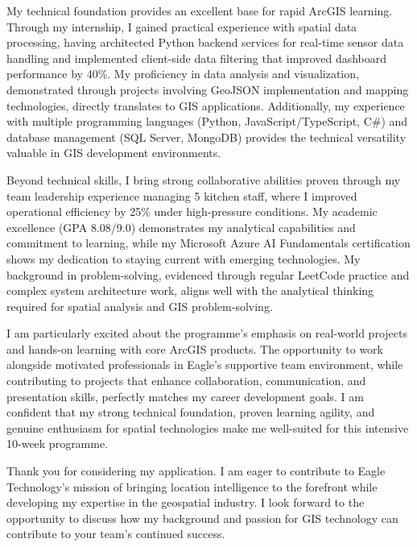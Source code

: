 \documentclass[11pt, a4paper]{awesome-cv}
\begin{document}
\begin{cvletter}
My technical foundation provides an excellent base for rapid ArcGIS learning. Through my internship, I gained practical experience with spatial data processing, having architected Python backend services for real-time sensor data handling and implemented client-side data filtering that improved dashboard performance by 40\%. My proficiency in data analysis and visualization, demonstrated through projects involving GeoJSON implementation and mapping technologies, directly translates to GIS applications. Additionally, my experience with multiple programming languages (Python, JavaScript/TypeScript, C\#) and database management (SQL Server, MongoDB) provides the technical versatility valuable in GIS development environments.

Beyond technical skills, I bring strong collaborative abilities proven through my team leadership experience managing 5 kitchen staff, where I improved operational efficiency by 25\% under high-pressure conditions. My academic excellence (GPA 8.08/9.0) demonstrates my analytical capabilities and commitment to learning, while my Microsoft Azure AI Fundamentals certification shows my dedication to staying current with emerging technologies. My background in problem-solving, evidenced through regular LeetCode practice and complex system architecture work, aligns well with the analytical thinking required for spatial analysis and GIS problem-solving.

I am particularly excited about the programme's emphasis on real-world projects and hands-on learning with core ArcGIS products. The opportunity to work alongside motivated professionals in Eagle's supportive team environment, while contributing to projects that enhance collaboration, communication, and presentation skills, perfectly matches my career development goals. I am confident that my strong technical foundation, proven learning agility, and genuine enthusiasm for spatial technologies make me well-suited for this intensive 10-week programme.

Thank you for considering my application. I am eager to contribute to Eagle Technology's mission of bringing location intelligence to the forefront while developing my expertise in the geospatial industry. I look forward to the opportunity to discuss how my background and passion for GIS technology can contribute to your team's continued success.

\end{cvletter}


\makeletterclosing
\end{document}
